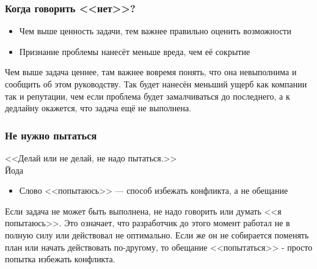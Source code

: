 \documentclass{../industrial-development}
\begin{document}
\begin{frame} \frametitle{Когда говорить <<нет>>?}
  \begin{itemize}
  \item Чем выше ценность задачи, тем важнее правильно оценить возможности
	\item Признание проблемы нанесёт меньше вреда, чем её сокрытие
  \end{itemize}
\end{frame}
\lecturenotes
Чем выше задача ценнее, там важнее вовремя понять, что она невыполнима и сообщить об этом руководству.
Так будет нанесён меньший ущерб как компании так и репутации, чем если проблема будет замалчиваться до последнего, а к дедлайну окажется, что задача ещё не выполнена.

\begin{frame} \frametitle{Не нужно пытаться}
\begin{flushright}
<<Делай или не делай, не надо пытаться.>>\\
Йода
\end{flushright}
  \begin{itemize}
  \item Слово <<попытаюсь>> --- способ избежать конфликта, а не обещание
  \end{itemize}
\end{frame}
\lecturenotes
Если задача не может быть выполнена, не надо говорить или думать <<я попытаюсь>>.
Это означает, что разработчик до этого момент работал не в полную силу или действовал не оптимально.
Если же он не собирается поменять план или начать действовать по-другому, то обещание <<попытаться>> - просто попытка избежать конфликта.
\end{document}
